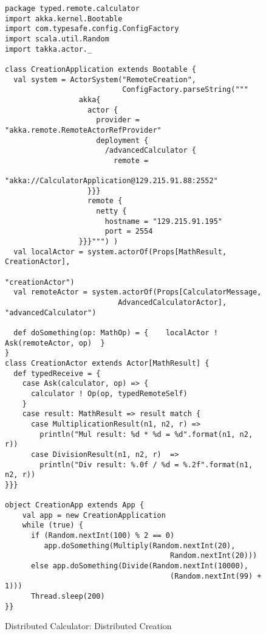 \begin{figure}[p]
\begin{lstlisting}
package typed.remote.calculator
import akka.kernel.Bootable
import com.typesafe.config.ConfigFactory
import scala.util.Random
import takka.actor._

class CreationApplication extends Bootable {
  val system = ActorSystem("RemoteCreation", 
                           ConfigFactory.parseString(""" 
                 akka{
                   actor {
                     provider = "akka.remote.RemoteActorRefProvider"
                     deployment {
                       /advancedCalculator {
                         remote = 
                                "akka://CalculatorApplication@129.215.91.88:2552"
                   }}}
                   remote {
                     netty {
                       hostname = "129.215.91.195"
                       port = 2554               
                 }}}""") )
  val localActor = system.actorOf(Props[MathResult, CreationActor],
                                                    "creationActor")
  val remoteActor = system.actorOf(Props[CalculatorMessage, 
                          AdvancedCalculatorActor], "advancedCalculator")

  def doSomething(op: MathOp) = {    localActor ! Ask(remoteActor, op)  }
}
class CreationActor extends Actor[MathResult] {
  def typedReceive = {
    case Ask(calculator, op) => {
      calculator ! Op(op, typedRemoteSelf)      
    }
    case result: MathResult => result match {
      case MultiplicationResult(n1, n2, r) => 
        println("Mul result: %d * %d = %d".format(n1, n2, r))
      case DivisionResult(n1, n2, r)  => 
        println("Div result: %.0f / %d = %.2f".format(n1, n2, r))
}}}

object CreationApp extends App {
    val app = new CreationApplication
    while (true) {
      if (Random.nextInt(100) % 2 == 0) 
         app.doSomething(Multiply(Random.nextInt(20), 
                                      Random.nextInt(20)))
      else app.doSomething(Divide(Random.nextInt(10000),
                                      (Random.nextInt(99) + 1)))
      Thread.sleep(200)
}}

\end{lstlisting}
\caption{Distributed Calculator: Distributed Creation}
\label{discal_distribute_creation}
\end{figure}

